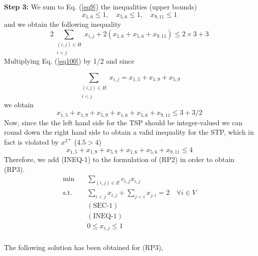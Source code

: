 \documentclass[12pt]{article}
\begin{document}
\textbf{Step 3:}
We sum to Eq. (\ref{eq9}) the inequalities (upper bounds)
\begin{equation}
    x_{1,6} \leq 1, \quad x_{5,6} \leq 1, \quad x_{9,11} \leq 1
\end{equation}
and we obtain the following inequality
\begin{equation}
   2\sum_{\substack{(i,j) \in H\\i<j}}x_{i,j} + 2(x_{1,6}+x_{5,6}+x_{9,11}) \leq 2\times3 + 3
   \label{eq100}
\end{equation}
Multiplying Eq. (\ref{eq100}) by 1/2 and since

\begin{equation}
    \sum_{\substack{(i,j) \in H\\i<j}}x_{i,j} = x_{1,5} + x_{1,9} + x_{5,9}
\end{equation}
we obtain
\begin{equation}
   x_{1,5} + x_{1,9} + x_{5,9} + x_{1,6}+x_{5,6}+x_{9,11} \leq 3 + 3/2
   \label{eq10}
\end{equation}
Now, since the the left hand side for the TSP should be integer-valued we can round down the right hand side to obtain a valid inequality for the STP, which in fact is violated by $x^{2*}$ ($4.5 > 4$)
\begin{equation}
   x_{1,5} + x_{1,9} + x_{5,9} + x_{1,6}+x_{5,6}+x_{9,11} \leq 4 \tag{INEQ-1}
   \label{eq10}
\end{equation}
Therefore, we add (INEQ-1) to the formulation of (RP2) in order to obtain (RP3).\\

\begin{equation}
    \begin{aligned}
        \min \quad & \sum_{(i,j)\in E}c_{i,j}x_{i,j}\\
        \textrm{s.t.} \quad & \sum_{i<j}x_{i,j} + \sum_{j<i}x_{j,i} = 2 \quad \forall i \in V\\
        & (\text{SEC-1})    \\
        & (\text{INEQ-1}) \\
        & 0 \leq x_{i,j}\leq 1   \\
    \end{aligned}
    \tag{RP3}\label{opt-P2}
\end{equation}

The following solution has been obtained for (RP3),
\end{document}
